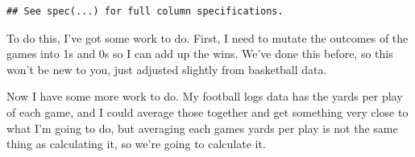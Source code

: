 \documentclass[
]{book}
\newenvironment{Shaded}{\begin{snugshade}}{\end{snugshade}}
\newcommand{\DataTypeTok}[1]{\textcolor[rgb]{0.13,0.29,0.53}{#1}}
\newcommand{\DecValTok}[1]{\textcolor[rgb]{0.00,0.00,0.81}{#1}}
\newcommand{\KeywordTok}[1]{\textcolor[rgb]{0.13,0.29,0.53}{\textbf{#1}}}
\newcommand{\NormalTok}[1]{#1}
\newcommand{\OperatorTok}[1]{\textcolor[rgb]{0.81,0.36,0.00}{\textbf{#1}}}
\newcommand{\StringTok}[1]{\textcolor[rgb]{0.31,0.60,0.02}{#1}}
\begin{document}
\begin{verbatim}
## See spec(...) for full column specifications.
\end{verbatim}

To do this, I've got some work to do. First, I need to mutate the outcomes of the games into 1s and 0s so I can add up the wins. We've done this before, so this won't be new to you, just adjusted slightly from basketball data.

\begin{Shaded}
\end{Shaded}

Now I have some more work to do. My football logs data has the yards per play of each game, and I could average those together and get something very close to what I'm going to do, but averaging each games yards per play is not the same thing as calculating it, so we're going to calculate it.

\begin{Shaded}
\end{Shaded}
\end{document}
